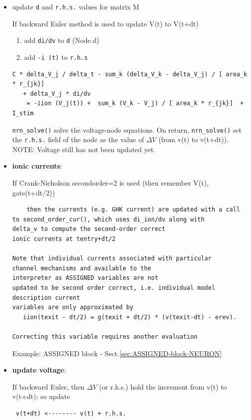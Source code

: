 \begin{itemize}
\begin{enumerate}
\begin{itemize}
       
       \item update \verb!d! and \verb!r.h.s.! values for matrix M

    If backward Euler method is used to update V(t) to V(t+dt)
       \begin{enumerate}
         \item add \verb!di/dv! to \verb!d! (Node.d)
         \item add \verb!-i (t)!  to \verb!r.h.s!   
       \end{enumerate}

{\small
\begin{verbatim}
C * delta_V_j / delta_t - sum_k (delta_V_k - delta_V_j) / [ area_k * r_{jk}]
   + delta_V_j * di/dv
    = -iion (V_j(t)) +  sum_k (V_k - V_j) / [ area_k * r_{jk}]  + I_stim
\end{verbatim}
}

\verb!nrn_solve()! solve the voltage-node equations. On return,
\verb!nrn_solve()! set the \verb!r.h.s.! field of the node as the value of
$\Delta V$ (from v(t) to v(t+dt)). NOTE: Voltage still has not been updated yet.

       \item {\bf ionic currents}:
       
    If Crank-Nicholson secondorder=2 is used (then remember V(t), gate(t+dt/2))
    \begin{verbatim}
    then the currents (e.g. GHK current) are updated with a call
to second_order_cur(), which uses di_ion/dv along with
delta_v to compute the second-order correct
ionic currents at tentry+dt/2

Note that individual currents associated with particular
channel mechanisms and available to the
interpreter as ASSIGNED variables are not
updated to be second order correct, i.e. individual model description current
variables are only approximated by 
   iion(texit - dt/2) = g(texit + dt/2) * (v(texit-dt) - erev).
   
Correcting this variable requires another evaluation   
    \end{verbatim}    
       
Example: ASSIGNED block - Sect.\ref{sec:ASSIGNED-block-NEURON}       
       
       
       \item {\bf update voltage}:
       
 If backward Euler, then $\Delta V$ (or r.h.s.) hold the increment from v(t) to
 v(t+dt); so update 
 
 \begin{verbatim}
 v(t+dt) <-------- v(t) + r.h.s.
 \end{verbatim}


\end{itemize}
\end{enumerate}
\end{itemize}
